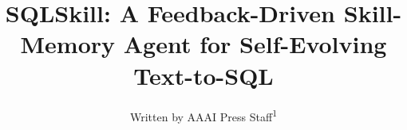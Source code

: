 \documentclass[letterpaper]{article} %
\title{SQLSkill: A Feedback-Driven Skill-Memory Agent for Self-Evolving Text-to-SQL}
\author{
    Written by AAAI Press Staff\textsuperscript{\rm 1}\\
}
\begin{document}
\maketitle

\begin{abstract}

\end{abstract}










\appendix

\end{document}
